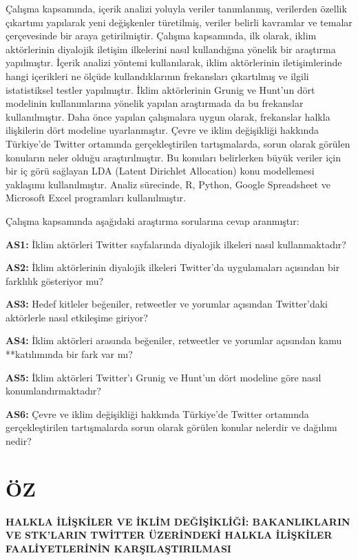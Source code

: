 \documentclass[
]{book}
\begin{document}
Çalışma kapsamında, içerik analizi \citep{yildirim2018sosyal} yoluyla veriler tanımlanmış, verilerden özellik çıkartımı yapılarak yeni değişkenler türetilmiş, veriler belirli kavramlar ve temalar çerçevesinde bir araya getirilmiştir. Çalışma kapsamında, ilk olarak, iklim aktörlerinin diyalojik iletişim ilkelerini nasıl kullandığına yönelik bir araştırma yapılmıştır. İçerik analizi yöntemi kullanılarak, iklim aktörlerinin iletişimlerinde hangi içerikleri ne ölçüde kullandıklarının frekansları çıkartılmış ve ilgili istatistiksel testler yapılmıştır. İklim aktörlerinin Grunig ve Hunt'un dört modelinin kullanımlarına yönelik yapılan araştırmada da bu frekanslar kullanılmıştır. Daha önce yapılan çalışmalara uygun olarak, frekanslar halkla ilişkilerin dört modeline uyarlanmıştır. Çevre ve iklim değişikliği hakkında Türkiye'de Twitter ortamında gerçekleştirilen tartışmalarda, sorun olarak görülen konuların neler olduğu araştırılmıştır. Bu konuları belirlerken büyük veriler için bir iç görü sağlayan LDA (Latent Dirichlet Allocation) konu modellemesi yaklaşımı kullanılmıştır. Analiz sürecinde, R, Python, Google Spreadsheet ve Microsoft Excel programları kullanılmıştır.

Çalışma kapsamında aşağıdaki araştırma sorularına cevap aranmıştır:

\textbf{AS1:} İklim aktörleri Twitter sayfalarında diyalojik ilkeleri nasıl kullanmaktadır?

\textbf{AS2:} İklim aktörlerinin diyalojik ilkeleri Twitter'da uygulamaları açısından bir farklılık gösteriyor mu?

\textbf{AS3:} Hedef kitleler beğeniler, retweetler ve yorumlar açısından Twitter'daki aktörlerle nasıl etkileşime giriyor?

\textbf{AS4:} İklim aktörleri arasında beğeniler, retweetler ve yorumlar açısından kamu **katılımında bir fark var mı?

\textbf{AS5:} İklim aktörleri Twitter'ı Grunig ve Hunt'un dört modeline göre nasıl konumlandırmaktadır?

\textbf{AS6:} Çevre ve iklim değişikliği hakkında Türkiye'de Twitter ortamında gerçekleştirilen tartışmalarda sorun olarak görülen konular nelerdir ve dağılımı nedir?

\hypertarget{uxf6z}{%
\chapter*{ÖZ}\label{uxf6z}}

\textbf{HALKLA İLİŞKİLER VE İKLİM DEĞİŞİKLİĞİ: BAKANLIKLARIN VE STK'LARIN TWİTTER ÜZERİNDEKİ HALKLA İLİŞKİLER FAALİYETLERİNİN KARŞILAŞTIRILMASI}
\end{document}
